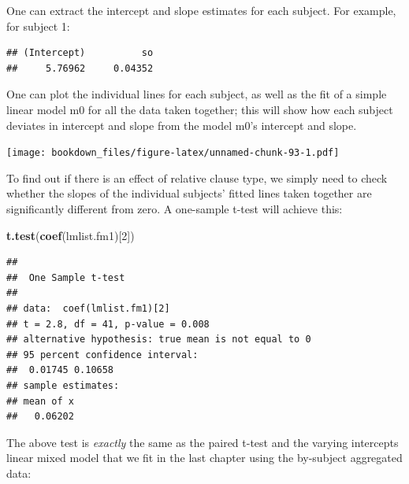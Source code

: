 \documentclass[12pt,]{krantz}
\newenvironment{Shaded}{\begin{snugshade}}{\end{snugshade}}
\newcommand{\DataTypeTok}[1]{\textcolor[rgb]{0.13,0.29,0.53}{#1}}
\newcommand{\DecValTok}[1]{\textcolor[rgb]{0.00,0.00,0.81}{#1}}
\newcommand{\KeywordTok}[1]{\textcolor[rgb]{0.13,0.29,0.53}{\textbf{#1}}}
\newcommand{\NormalTok}[1]{#1}
\newcommand{\OperatorTok}[1]{\textcolor[rgb]{0.81,0.36,0.00}{\textbf{#1}}}
\newcommand{\OtherTok}[1]{\textcolor[rgb]{0.56,0.35,0.01}{#1}}
\newcommand{\StringTok}[1]{\textcolor[rgb]{0.31,0.60,0.02}{#1}}
\begin{document}
One can extract the intercept and slope estimates for each subject. For example, for subject 1:

\begin{Shaded}
\end{Shaded}

\begin{verbatim}
## (Intercept)          so 
##     5.76962     0.04352
\end{verbatim}

One can plot the individual lines for each subject, as well as the fit of a simple linear model m0 for all the data taken together; this will show how each subject deviates in intercept and slope from the model m0's intercept and slope.

\texttt{[image: bookdown\_files/figure-latex/unnamed-chunk-93-1.pdf]}

To find out if there is an effect of relative clause type, we simply need to check whether the slopes of the individual subjects' fitted lines taken together are significantly different from zero. A one-sample t-test will achieve this:

\begin{Shaded}
\begin{Highlighting}[]
\KeywordTok{t.test}\NormalTok{(}\KeywordTok{coef}\NormalTok{(lmlist.fm1)[}\DecValTok{2}\NormalTok{])}
\end{Highlighting}
\end{Shaded}

\begin{verbatim}
## 
## 	One Sample t-test
## 
## data:  coef(lmlist.fm1)[2]
## t = 2.8, df = 41, p-value = 0.008
## alternative hypothesis: true mean is not equal to 0
## 95 percent confidence interval:
##  0.01745 0.10658
## sample estimates:
## mean of x 
##   0.06202
\end{verbatim}

The above test is \emph{exactly} the same as the paired t-test and the varying intercepts linear mixed model that we fit in the last chapter using the by-subject aggregated data:

\begin{Shaded}
\end{Shaded}
\end{document}
